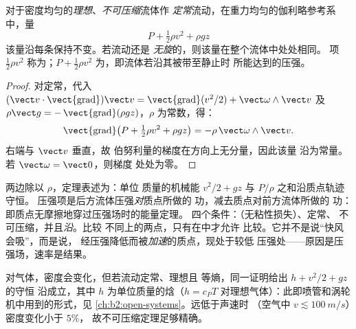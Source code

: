 \begin{theorem}[伯努利]\label{thm:b2:euler-bernoulli:bernoulli}
对于密度均匀的\emph{理想}、\emph{不可压缩}流体作
\emph{定常}流动，在重力均匀的伽利略参考系中，量
\[
P + \tfrac12\rho v^2 + \rho gz
\]
该量沿每条\emph{}保持不变。若流动还是
\emph{无旋}的，则该量在整个流体中处处相同。
项 $\tfrac12\rho v^2$ 称为\emph{}；$P + \tfrac12\rho v^2$
为\emph{}，即流体若沿其被带至静止时
所能达到的压强。
\end{theorem}

\begin{proof}
对定常，代入 $(\vect v\cdot\operatorname{\vect{grad}})\vect v =
\operatorname{\vect{grad}}(v^2/2) + \vect\omega\wedge\vect v$ 及 $\rho\vect g =
-\operatorname{\vect{grad}}(\rho gz)$，$\rho$ 为常数，得：
\[
\operatorname{\vect{grad}}\bigl(P + \tfrac12\rho v^2 + \rho gz\bigr) = -\rho\,
\vect\omega\wedge\vect v .
\]
右端与 $\vect v$ 垂直，故
伯努利量的梯度在方向上无分量，因此该量
沿为常量。若 $\vect\omega = \vect 0$，则梯度
处处为零。
\end{proof}

\begin{remark}\label{rem:b2:euler-bernoulli:meaning}
两边除以 $\rho$，定理表述为：单位
质量的机械能 $v^2/2 + gz$ 与 $P/\rho$ 之和沿质点轨迹守恒。
压强项是后方流体压强\emph{对}质点所做的
功，减去质点对前方流体所做的
功：即质点无摩擦地穿过压强场时的能量定理。
四个条件：（无粘性损失）、定常、
不可压缩，并且\emph{沿}。比较
不同上的两点，只有在中才允许
比较。它并不是说“快风会吸”，而是说，
经压强降低而被\emph{加速}的质点，现处于较低
压强处——原因是压强场，速率是结果。
\end{remark}

\begin{remark}[可压缩流体]\label{rem:b2:euler-bernoulli:compressible}
对气体，密度会变化，但若流动定常、理想且
等熵，同一证明给出 $h + v^2/2 + gz$ 的守恒
沿成立，其中 $h$ 为单位质量的焓（$h = c_PT$
对理想气体）：此即喷管和涡轮机中用到的形式，见
\cref{ch:b2:open-systems}。远低于声速时
（空气中 $v \lesssim \qty{100}{m/s}$）密度变化小于 $5\%$，
故不可压缩定理足够精确。
\end{remark}

